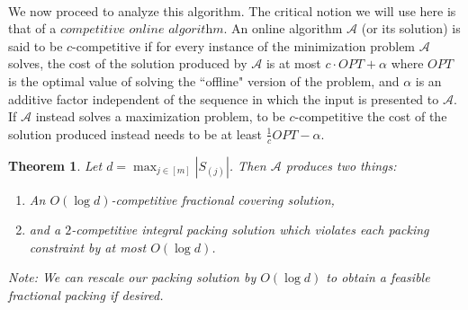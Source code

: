 \documentclass[letterpaper,12pt,oneside,onecolumn]{article}
\newcommand{\cA}{\mathcal{A}} \newcommand{\cB}{\mathcal{B}}
\newtheorem{theorem}[fact]{Theorem}
\begin{document}
\paragraph{}
We now proceed to analyze this algorithm. The critical notion we will use here is that of a $\textit{competitive online algorithm}$. An online algorithm $\cA$ (or its solution) is said to be $c$-competitive if for every instance of the minimization problem $\cA$ solves, the cost of the solution produced by $\cA$ is at most $c\cdot OPT + \alpha$ where $OPT$ is the optimal value of solving the ``offline" version of the problem, and $\alpha$ is an additive factor independent of the sequence in which the input is presented to $\cA$. If $\cA$ instead solves a maximization problem, to be $c$-competitive the cost of the solution produced instead needs to be at least $\frac{1}{c} OPT -\alpha$.
\begin{theorem}\label{th:1}
Let $d = \max_{j \in [m]} |S_(j)|$. Then $\cA$ produces two things:
\begin{enumerate}
\item An $O(\log d)$-competitive fractional covering solution,
\item and a $2$-competitive integral packing solution which violates each packing constraint by at most $O(\log d)$.
\end{enumerate}
Note: We can rescale our packing solution by $O(\log d)$ to obtain a feasible fractional packing if desired.
\end{theorem}
\end{document}
